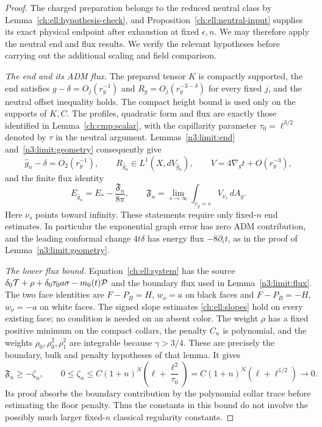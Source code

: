 \begin{proof}
The charged preparation belongs to the reduced neutral class by
Lemma~\ref{ch:ell:hypothesis-check}, and
Proposition~\ref{ch:ell:neutral-input} supplies its exact physical
endpoint after exhaustion at fixed $\epsilon,n$. We may therefore
apply the neutral end and flux results. We verify the relevant
hypotheses before carrying out the additional scaling and field
comparison.

\emph{The end and its ADM flux.}
The prepared tensor $K$ is compactly supported, the end satisfies
$g-\delta=O_j(r_y^{-1})$ and $R_g=O_j(r_y^{-3-\delta})$ for every
fixed $j$, and the neutral offset inequality holds. The compact
height bound is used only on the supports of $K,C$. The profiles,
quadratic form and flux are exactly those identified in
Lemma~\ref{ch:cmp:scalar}, with the capillarity parameter
$\tau_0=\ell^{3/2}$ denoted by $\tau$ in the neutral argument.
Lemmas~\ref{n3:limit:end} and~\ref{n3:limit:geometry} consequently give
\[
 \hat g_n-\delta=O_2(r_y^{-1}),\qquad
 R_{\hat g_n}\in L^1(X,dV_{\hat g_n}),\qquad
 V=4\nabla_gt+O(r_y^{-3}),
\]
and the finite flux identity
\begin{equation}\label{ch:mass:adm-flux-identity}
 E_{\hat g_n}=E_*-\frac{\mathfrak F_n}{8\pi},\qquad
 \mathfrak F_n=\lim_{s\to\infty}
                   \int_{r_y=s}V_{\nu_s}\,dA_g.
\end{equation}
Here $\nu_s$ points toward infinity. These statements require only
fixed-$n$ end estimates. In particular the exponential graph error
has zero ADM contribution, and the leading conformal change
$4t\delta$ has energy flux $-8\partial_i t$, as in the proof of
Lemma~\ref{n3:limit:geometry}.

\emph{The lower flux bound.}
Equation~\eqref{ch:ell:system} has the source
$\delta_0\mathcal T+\rho+\delta_0\tau_0a\sigma-m_0(t)\mathcal P$ and the
boundary flux used in Lemma~\ref{n3:limit:flux}. The two face
identities are $F-P_B=H$, $w_\nu=a$ on black faces and
$F-P_B=-H$, $w_\nu=-a$ on white faces. The signed slope estimates
\eqref{ch:ell:slopes} hold on every existing face; no condition is
needed on an absent color. The weight $\rho$ has a fixed positive
minimum on the compact collars, the penalty $C_n$ is polynomial,
and the weights $\rho_0,\rho_0^2,\rho_1^2$ are integrable because
$\gamma>3/4$. These are precisely the boundary, bulk and penalty
hypotheses of that lemma. It gives
\begin{equation}\label{ch:mass:vanishing-error}
 \mathfrak F_n\ge-\zeta_n,\qquad
 0\le\zeta_n\le C(1+n)^N
         \left(\ell+\frac{\ell^2}{\tau_0}\right)
       =C(1+n)^N(\ell+\ell^{1/2})\longrightarrow0.
\end{equation}
Its proof absorbs the boundary contribution by the polynomial
collar trace before estimating the floor penalty. Thus the constants
in this bound do not involve the possibly much larger fixed-$n$
classical regularity constants.


\end{proof}
